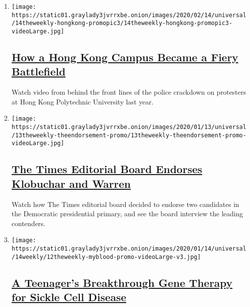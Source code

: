 \begin{enumerate}
\def\labelenumi{\arabic{enumi}.}
\item
  \texttt{[image: https://static01.graylady3jvrrxbe.onion/images/2020/02/14/universal/14theweekly-hongkong-promopic3/14theweekly-hongkong-promopic3-videoLarge.jpg]}

  \hypertarget{how-a-hong-kong-campus-became-a-fiery-battlefield}{%
  \subsection{\texorpdfstring{\href{/2020/02/14/the-weekly/hong-kong-protest-polyu.html}{How
  a Hong Kong Campus Became a Fiery
  Battlefield}}{How a Hong Kong Campus Became a Fiery Battlefield}}\label{how-a-hong-kong-campus-became-a-fiery-battlefield}}

  Watch video from behind the front lines of the police crackdown on
  protesters at Hong Kong Polytechnic University last year.
\item
  \texttt{[image: https://static01.graylady3jvrrxbe.onion/images/2020/01/13/universal/13theweekly-theendorsement-promo/13theweekly-theendorsement-promo-videoLarge.jpg]}

  \hypertarget{the-times-editorial-board-endorses-klobuchar-and-warren}{%
  \subsection{\texorpdfstring{\href{/2020/01/13/the-weekly/democratic-endorsement-2020.html}{The
  Times Editorial Board Endorses Klobuchar and
  Warren}}{The Times Editorial Board Endorses Klobuchar and Warren}}\label{the-times-editorial-board-endorses-klobuchar-and-warren}}

  Watch how The Times editorial board decided to endorse two candidates
  in the Democratic presidential primary, and see the board interview
  the leading contenders.
\item
  \texttt{[image: https://static01.graylady3jvrrxbe.onion/images/2020/01/14/universal/14weekly/12theweekly-myblood-promo-videoLarge-v3.jpg]}

  \hypertarget{a-teenagers-breakthrough-gene-therapy-for-sickle-cell-disease}{%
  \subsection{\texorpdfstring{\href{/2020/01/10/the-weekly/sickle-cell-dna-reset.html}{A
  Teenager's Breakthrough Gene Therapy for Sickle Cell
  Disease}}{A Teenager's Breakthrough Gene Therapy for Sickle Cell Disease}}\label{a-teenagers-breakthrough-gene-therapy-for-sickle-cell-disease}}


\end{enumerate}
